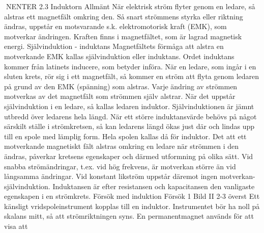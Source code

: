 NENTER
2.3 Induktorn
Allmänt
När elektrisk ström flyter genom en ledare,
så alstras ett magnetfält omkring den. Så
snart strömmens styrka eller riktning ändras,
uppstår en motsvarande s.k. elektromotorisk kraft (EMK), som motverkar ändringen.
Kraften finns i magnetfältet, som är lagrad
magnetisk energi.
Självinduktion - induktans
Magnetfältets förmåga att alstra en motverkande EMK kallas självinduktion eller induktans. Ordet induktans kommer från latinets
inducere, som betyder införa.
När en ledare, som ingår i en sluten krets,
rör sig i ett magnetfält, så kommer en ström
att flyta genom ledaren på grund av den
EMK (spänning) som alstras. Varje ändring
av strömmen motverkas av det magnetfält
som strömmen själv alstrar.
När det uppstår självinduktion i en ledare,
så kallas ledaren induktor. Självinduktionen
är jämnt utbredd över ledarens hela längd.
När ett större induktansvärde behövs på
något särskilt ställe i strömkretsen, så kan
ledarens längd ökas just där och lindas upp
till en spole med lämplig form. Hela spolen
kallas då för induktor.
Det att ett motverkande magnetiskt fält
alstras omkring en ledare när strömmen i
den ändras, påverkar kretsens egenskaper
och därmed utformning på olika sätt. Vid
snabba strömändringar, t.ex. vid hög frekvens, är motverkan större än vid långsamma
ändringar. Vid konstant likström uppstår
däremot ingen motverkan- självinduktion.
Induktansen är efter resistansen och
kapacitansen den vanligaste egenskapen i
en strömkrets.
Försök med induktion
Försök 1
Bild II 2-3 överst
Ett känsligt vridspoleinstrument kopplas till
en induktor. Instrumentet bör ha noll på
skalans mitt, så att strömriktningen syns. En
permanentmagnet används för att visa att


